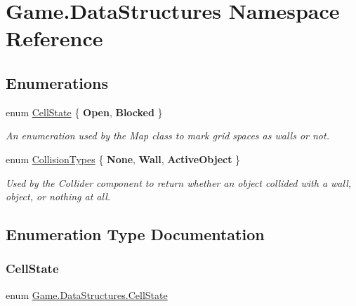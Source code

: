 \hypertarget{namespace_game_1_1_data_structures}{}\section{Game.\+Data\+Structures Namespace Reference}
\label{namespace_game_1_1_data_structures}
\subsection*{Enumerations}
\begin{DoxyCompactItemize}
\item 
enum \mbox{\hyperlink{namespace_game_1_1_data_structures_a24fec17346a5ad535ffe81e59a617f57}{Cell\+State}} \{ {\bfseries Open}, 
{\bfseries Blocked}
 \}
\begin{DoxyCompactList}\small\item\em An enumeration used by the Map class to mark grid spaces as walls or not. \end{DoxyCompactList}\item 
enum \mbox{\hyperlink{namespace_game_1_1_data_structures_ada1f9e4784b55145987867a5daf71d4d}{Collision\+Types}} \{ {\bfseries None}, 
{\bfseries Wall}, 
{\bfseries Active\+Object}
 \}
\begin{DoxyCompactList}\small\item\em Used by the Collider component to return whether an object collided with a wall, object, or nothing at all. \end{DoxyCompactList}\end{DoxyCompactItemize}


\subsection{Enumeration Type Documentation}
\mbox{\label{namespace_game_1_1_data_structures_a24fec17346a5ad535ffe81e59a617f57}} 
\subsubsection{\texorpdfstring{Cell\+State}{CellState}}
{\footnotesize\ttfamily enum \mbox{\hyperlink{namespace_game_1_1_data_structures_a24fec17346a5ad535ffe81e59a617f57}{Game.\+Data\+Structures.\+Cell\+State}}\hspace{0.3cm}{\ttfamily [strong]}}



